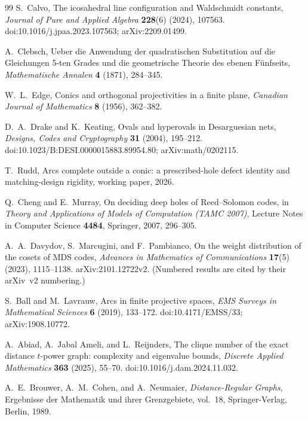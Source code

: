 \documentclass[11pt]{article}
\theoremstyle{definition}
\theoremstyle{remark}
\begin{document}
\begin{thebibliography}{99}
S.~Calvo,
\newblock The icosahedral line configuration and Waldschmidt constants,
\newblock \emph{Journal of Pure and Applied Algebra} \textbf{228}(6)
(2024), 107563.
\newblock doi:10.1016/j.jpaa.2023.107563; arXiv:2209.01499.

A.~Clebsch,
\newblock Ueber die Anwendung der quadratischen Substitution auf die
Gleichungen 5-ten Grades und die geometrische Theorie des ebenen Fünfseits,
\newblock \emph{Mathematische Annalen} \textbf{4} (1871), 284--345.

W.~L.~Edge,
\newblock Conics and orthogonal projectivities in a finite plane,
\newblock \emph{Canadian Journal of Mathematics} \textbf{8} (1956), 362--382.

D.~A.~Drake and K.~Keating,
\newblock Ovals and hyperovals in Desarguesian nets,
\newblock \emph{Designs, Codes and Cryptography} \textbf{31} (2004),
195--212.
\newblock doi:10.1023/B:DESI.0000015883.89954.80;
arXiv:math/0202115.

T.~Rudd,
\newblock Arcs complete outside a conic: a prescribed-hole defect identity
and matching-design rigidity,
\newblock working paper, 2026.

Q.~Cheng and E.~Murray,
\newblock On deciding deep holes of Reed--Solomon codes,
\newblock in \emph{Theory and Applications of Models of Computation (TAMC
2007)}, Lecture Notes in Computer Science \textbf{4484}, Springer, 2007,
296--305.

A.~A.~Davydov, S.~Marcugini, and F.~Pambianco,
\newblock On the weight distribution of the cosets of MDS codes,
\newblock \emph{Advances in Mathematics of Communications} \textbf{17}(5)
(2023), 1115--1138.
\newblock arXiv:2101.12722v2.
\newblock (Numbered results are cited by their arXiv~v2 numbering.)

S.~Ball and M.~Lavrauw,
\newblock Arcs in finite projective spaces,
\newblock \emph{EMS Surveys in Mathematical Sciences} \textbf{6} (2019),
133--172.
\newblock doi:10.4171/EMSS/33; arXiv:1908.10772.

A.~Abiad, A.~Jabal Ameli, and L.~Reijnders,
\newblock The clique number of the exact distance $t$-power graph:
complexity and eigenvalue bounds,
\newblock \emph{Discrete Applied Mathematics} \textbf{363} (2025), 55--70.
\newblock doi:10.1016/j.dam.2024.11.032.

A.~E.~Brouwer, A.~M.~Cohen, and A.~Neumaier,
\newblock \emph{Distance-Regular Graphs},
\newblock Ergebnisse der Mathematik und ihrer Grenzgebiete, vol.~18,
Springer-Verlag, Berlin, 1989.


\end{thebibliography}
\end{document}
